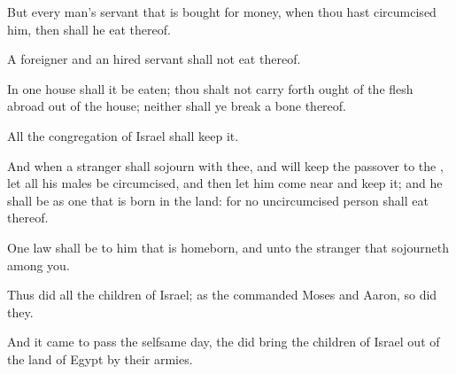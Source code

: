 {But every
man’s
servant that is
bought for
money, when thou hast
circumcised him, then shall he
eat thereof.

A
foreigner and an hired
servant shall not
eat thereof.

In
one
house shall it be
eaten; thou shalt not carry
forth ought of the
flesh
abroad out of the
house; neither shall ye
break a
bone thereof.

All the
congregation of
Israel shall
keep it.

And when a
stranger shall
sojourn with thee, and will
keep the
passover to the
{}, let all his
males be
circumcised, and then let him come
near and
keep it; and he shall be as one that is
born in the
land: for no uncircumcised
person shall
eat thereof.

One
law shall be to him that is
homeborn, and unto the
stranger that
sojourneth
among you.

Thus
did all the
children of
Israel; as the
{}
commanded
Moses and
Aaron, so
did they.

And it came to pass the
selfsame
day,
{} the
{} did
bring the
children of
Israel out of the
land of
Egypt by their
armies.




\par }
